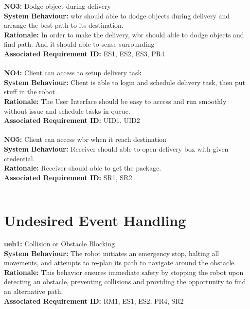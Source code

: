 \documentclass[12pt]{article}
\begin{document}
\noindent\textbf{NO3:} Dodge object during delivery\\
\textbf{System Behaviour:} \acrshort{wbr} should able to dodge objects during delivery and arrange the best path to its destination.\\
\textbf{Rationale:} In order to make the delivery, \acrshort{wbr} should able to dodge objects and find path. And it should able to sense surrounding\\
\textbf{Associated Requirement ID:} ES1, ES2, ES3, PR4 \\\\

\noindent\textbf{NO4:} Client can access to setup delivery task \\
\textbf{System Behaviour:} Client is able to login and schedule delivery task, then put stuff in the robot.\\
\textbf{Rationale:} The User Interface should be easy to access and run smoothly without issue and schedule tasks in queue.\\
\textbf{Associated Requirement ID:} UID1, UID2 \\\\

\noindent\textbf{NO5:} Client can access \acrshort{wbr} when it reach destination \\
\textbf{System Behaviour:} Receiver should able to open delivery box with given credential. \\
\textbf{Rationale:} Receiver should able to get the package.\\
\textbf{Associated Requirement ID:} SR1, SR2 \\\\



\section{Undesired Event Handling}
\textbf{\acrshort{ueh}1:} Collision or Obstacle Blocking\\
\textbf{System Behaviour:} The robot initiates an emergency stop, halting all movements, and attempts to re-plan its path to navigate around the obstacle.\\
\textbf{Rationale:} This behavior ensures immediate safety by stopping the robot upon detecting an obstacle, preventing collisions and providing the opportunity to find an alternative path.\\
\textbf{Associated Requirement ID:} RM1, ES1, ES2, PR4, SR2\\\\
\end{document}
